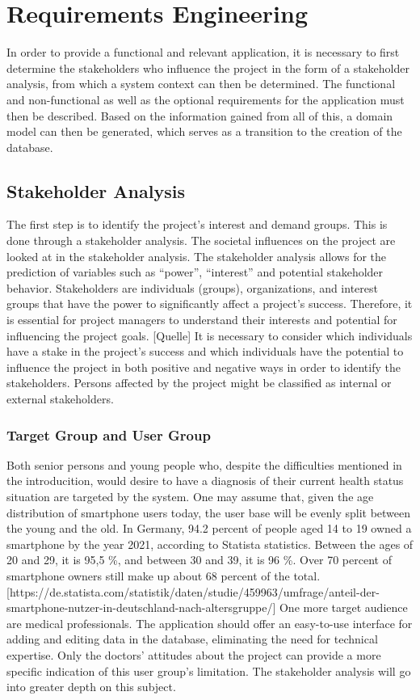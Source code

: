 
\chapter{Requirements Engineering}
In order to provide a functional and relevant application, it is necessary to first determine the stakeholders who influence the project in the form of a stakeholder analysis, from which a system context can then be determined. The functional and non-functional as well as the optional requirements for the application must then be described. Based on the information gained from all of this, a domain model can then be generated, which serves as a transition to the creation of the database.

\section{Stakeholder Analysis}
The first step is to identify the project's interest and demand groups. This is done through a stakeholder analysis. The societal influences on the project are looked at in the stakeholder analysis. The stakeholder analysis allows for the prediction of variables such as “power”, “interest” and potential stakeholder behavior. Stakeholders are individuals (groups), organizations, and interest groups that have the power to significantly affect a project's success. Therefore, it is essential for project managers to understand their interests and potential for influencing the project goals. [Quelle] It is necessary to consider which individuals have a stake in the project's success and which individuals have the potential to influence the project in both positive and negative ways in order to identify the stakeholders. Persons affected by the project might be classified as internal or external stakeholders. 

\subsection{Target Group and User Group}
Both senior persons and young people who, despite the difficulties mentioned in the introducition, would desire to have a diagnosis of their current health status situation are targeted by the system. One may assume that, given the age distribution of smartphone users today, the user base will be evenly split between the young and the old. In Germany, 94.2 percent of people aged 14 to 19 owned a smartphone by the year 2021, according to Statista statistics. Between the ages of 20 and 29, it is 95,5 \%, and between 30 and 39, it is 96 \%. Over 70 percent of smartphone owners still make up about 68 percent of the total.  [https://de.statista.com/statistik/daten/studie/459963/umfrage/anteil-der-smartphone-nutzer-in-deutschland-nach-altersgruppe/]
One more target audience are medical professionals. The application should offer an easy-to-use interface for adding and editing data in the database, eliminating the need for technical expertise. Only the doctors' attitudes about the project can provide a more specific indication of this user group's limitation. The stakeholder analysis will go into greater depth on this subject. 

